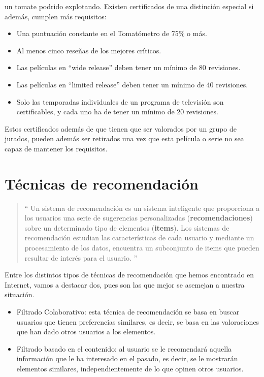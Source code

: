 \begin{itemize}
     un tomate podrido explotando.
    Existen certificados de una distinción especial si además, cumplen más
     requisitos:
     \begin{itemize}
         \item Una puntuación constante en el Tomatómetro de 75\% o más.
         \item Al menos cinco reseñas de los mejores críticos.
         \item Las películas en ``wide release'' deben tener un mínimo de 80 revisiones.
         \item Las películas en ``limited release'' deben tener un mínimo de 40 revisiones.
         \item Solo las temporadas individuales de un programa de televisión son certificables, y cada uno ha de tener un mínimo de 20 revisiones.
     \end{itemize}
    Estos certificados además de que tienen que ser valorados por un grupo de jurados, pueden además ser retirados una vez que esta película o serie
    no sea capaz de mantener los requisitos.
\end{itemize}

\section{Técnicas de recomendación}
\label{makereference2.3}

\begin{quote}
``
Un sistema de recomendación es un sistema inteligente que proporciona a los usuarios una serie de 
sugerencias personalizadas (\textbf{recomendaciones}) sobre un determinado tipo de elementos (\textbf{items}). Los 
sistemas de recomendación estudian las características de cada usuario y mediante un procesamiento 
de los datos, encuentra un subconjunto de items que pueden resultar de interés para el usuario. 
''
\end{quote}

Entre los distintos tipos de técnicas de recomendación que hemos encontrado en Internet, vamos a destacar dos, pues son las que mejor se asemejan a nuestra situación.

\begin{itemize}
    \item Filtrado Colaborativo\cite{filtradocolaborativo}: esta técnica de recomendación se basa en buscar usuarios que tienen preferencias similares, es decir, se basa en las valoraciones que han dado otros usuarios a los elementos.
    \item Filtrado basado en el contenido\cite{filtradocontenido}: al usuario se le recomendará aquella información que le ha interesado en el pasado, es decir, se le mostrarán elementos similares, independientemente de lo que opinen otros usuarios. 
\end{itemize} 


